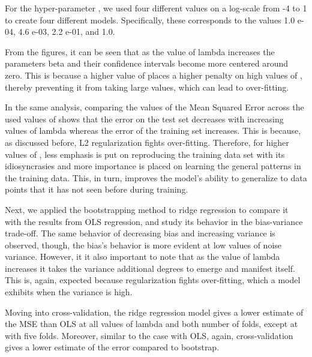 \documentclass{article}
\begin{document}
For the hyper-parameter , we used four different values on a log-scale from -4 to 1 to create four different models. Specifically, these corresponds to the values 1.0 e-04, 4.6 e-03, 2.2 e-01, and 1.0.

From the figures, it can be seen that as the value of lambda increases the parameters beta and their confidence intervals become more centered around zero. This is because a higher value of  places a higher penalty on high values of , thereby preventing it from taking large values, which can lead to over-fitting.

In the same analysis, comparing the values of the Mean Squared Error across the used values of  shows that the error on the test set decreases with increasing values of lambda whereas the error of the training set increases. This is because, as discussed before, L2 regularization fights over-fitting. Therefore, for higher values of , less emphasis is put on reproducing the training data set with its idiosyncrasies and more importance is placed on learning the general patterns in the training data. This, in turn, improves the model’s ability to generalize to data points that it has not seen before during training.

Next, we applied the bootstrapping method to ridge regression to compare it with the results from OLS regression, and study its behavior in the bias-variance trade-off. The same behavior of decreasing bias and increasing variance is observed, though, the bias’s behavior is more evident at low values of noise variance. However, it it also important to note that as the value of lambda increases it takes the variance additional degrees to emerge and manifest itself. This is, again, expected because regularization fights over-fitting, which a model exhibits when the variance is high.

Moving into cross-validation, the ridge regression model gives a lower estimate of the MSE than OLS at all values of lambda and both number of folds, except at  with five folds. Moreover, similar to the case with OLS, again, cross-validation gives a lower estimate of the error compared to bootstrap.
\end{document}
